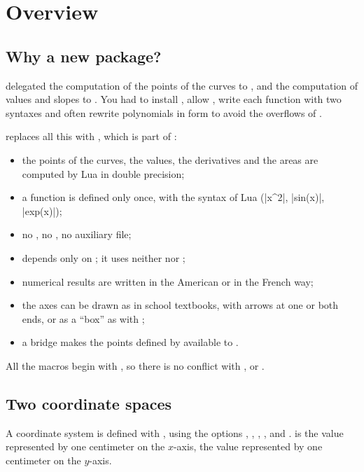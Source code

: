 \section{Overview}

\subsection{Why a new package?}

 delegated the computation of the points of the curves to , and the computation of values and slopes to . You had to install , allow , write each function with two syntaxes and often rewrite polynomials in  form to avoid the overflows of .

 replaces all this with , which is part of :
\begin{itemize}
  \item the points of the curves, the values, the derivatives and the areas are computed by Lua in double precision;
  \item a function is defined only once, with the syntax of Lua (|x^2|, |sin(x)|, |exp(x)|);
  \item no , no , no auxiliary file;
  \item {} depends only on \TIKZ; it uses neither  nor ;
  \item numerical results are written in the American or in the French way;
  \item the axes can be drawn as in school textbooks, with arrows at one or both ends, or as a ``box'' as with ;
  \item a bridge makes the points defined by  available to .
\end{itemize}

All the macros begin with , so there is no conflict with ,  or .

\subsection{Two coordinate spaces}

A coordinate system is defined with , using the options , , , ,  and .  is the value represented by one centimeter on the $x$-axis,  the value represented by one centimeter on the $y$-axis.


